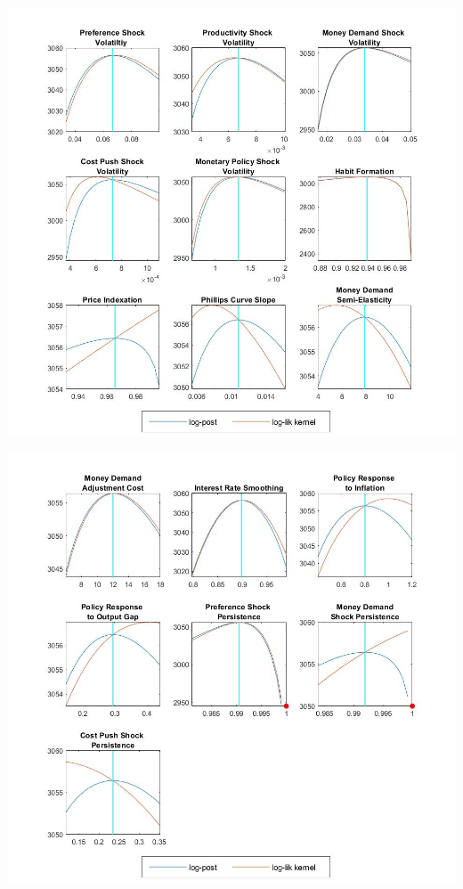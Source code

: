 \documentclass[11pt,preprint, authoryear]{elsarticle}
\let\origfigure\figure
\let\endorigfigure\endfigure
\renewenvironment{figure}[1][2] {
    \expandafter\origfigure\expandafter[H]
} {
    \endorigfigure
}
\numberwithin{equation}{section}
\numberwithin{figure}{section}
\numberwithin{table}{section}
\begin{document}
\begin{figure}
    \centering 
    \begin{minipage}[t]{8.2cm} 
        \centering 
        \includegraphics[width=\linewidth]{taylor.jpg} 
    \end{minipage} 
    \hspace{0.1cm} 
    \begin{minipage}[t]{8.2cm} 
        \centering 
        \includegraphics[width=\linewidth]{taylor1.jpg} 
    \end{minipage}
    \caption{Mode Check Plots - Taylor Rule}
    \label{mode_tay}
\end{figure}
\end{document}
